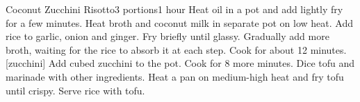 \documentclass[]{article}
\begin{document}
\begin{recipe}{Coconut Zucchini Risotto}{3 portions}{1 hour}
	Heat oil in a pot and add lightly fry for a few minutes.
	Heat broth and coconut milk in separate pot on low heat.
	Add rice to garlic, onion and ginger. 
	Fry briefly until glassy.
	\newstep
	Gradually add more broth, waiting for the rice to absorb it at each step.
	Cook for about 12 minutes.
	[zucchini]
	Add cubed zucchini to the pot. 
	Cook for 8 more minutes.
	Dice tofu and marinade with other ingredients.
	\newstep
	Heat a pan on medium-high heat and fry tofu until crispy.
	\newstep
	Serve rice with tofu.
\end{recipe}
\end{document}
